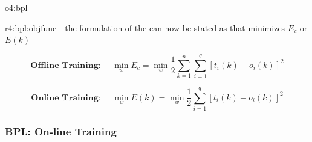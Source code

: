 \documentclass{tron}
\begin{document}
\begin{overview}{o4:bpl}
\begin{remark}{r4:bpl:objfunc}
		- the formulation of the  can now be stated as  that minimizes $E_c$ or $E(k)$

		\begin{equation}
			\textbf{Offline Training: } \quad \min_w E_c = \min_w  \frac{1}{2} \sum_{k=1}^n \sum_{i=1}^q [t_i (k) - o_i (k)]^2
		\end{equation}
		
		\begin{equation}
			\textbf{Online Training: } \quad \min_w E(k) = \min_w  \frac{1}{2} \sum_{i=1}^q [t_i (k) - o_i (k)]^2
		\end{equation}
	\end{remark}
\end{overview}

\subsubsection{\Gls{BPL}: On-line Training}
\end{document}
